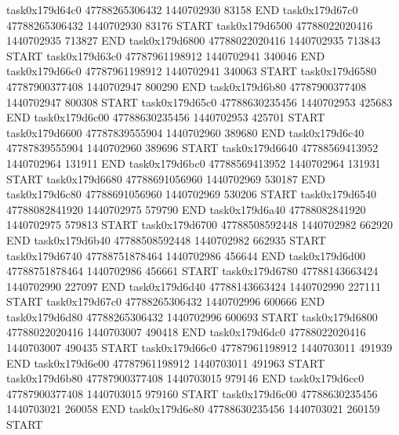 task0x179d64c0 47788265306432          1440702930                83158  END
task0x179d67c0 47788265306432          1440702930                83176  START
task0x179d6500 47788022020416          1440702935               713827  END
task0x179d6800 47788022020416          1440702935               713843  START
task0x179d63c0 47787961198912          1440702941               340046  END
task0x179d66c0 47787961198912          1440702941               340063  START
task0x179d6580 47787900377408          1440702947               800290  END
task0x179d6b80 47787900377408          1440702947               800308  START
task0x179d65c0 47788630235456          1440702953               425683  END
task0x179d6c00 47788630235456          1440702953               425701  START
task0x179d6600 47787839555904          1440702960               389680  END
task0x179d6c40 47787839555904          1440702960               389696  START
task0x179d6640 47788569413952          1440702964               131911  END
task0x179d6bc0 47788569413952          1440702964               131931  START
task0x179d6680 47788691056960          1440702969               530187  END
task0x179d6c80 47788691056960          1440702969               530206  START
task0x179d6540 47788082841920          1440702975               579790  END
task0x179d6a40 47788082841920          1440702975               579813  START
task0x179d6700 47788508592448          1440702982               662920  END
task0x179d6b40 47788508592448          1440702982               662935  START
task0x179d6740 47788751878464          1440702986               456644  END
task0x179d6d00 47788751878464          1440702986               456661  START
task0x179d6780 47788143663424          1440702990               227097  END
task0x179d6d40 47788143663424          1440702990               227111  START
task0x179d67c0 47788265306432          1440702996               600666  END
task0x179d6d80 47788265306432          1440702996               600693  START
task0x179d6800 47788022020416          1440703007               490418  END
task0x179d6dc0 47788022020416          1440703007               490435  START
task0x179d66c0 47787961198912          1440703011               491939  END
task0x179d6e00 47787961198912          1440703011               491963  START
task0x179d6b80 47787900377408          1440703015               979146  END
task0x179d6cc0 47787900377408          1440703015               979160  START
task0x179d6c00 47788630235456          1440703021               260058  END
task0x179d6e80 47788630235456          1440703021               260159  START
